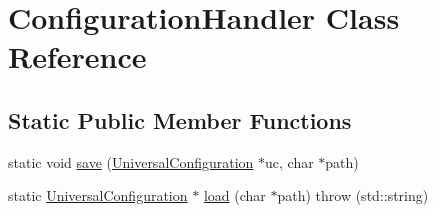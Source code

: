\hypertarget{classConfigurationHandler}{
\section{ConfigurationHandler Class Reference}
\label{classConfigurationHandler}
}
\subsection*{Static Public Member Functions}
\begin{DoxyCompactItemize}
\item 
static void \hyperlink{classConfigurationHandler_aa674575c4f2239d750ad76b47eb239ad}{save} (\hyperlink{classUniversalConfiguration}{UniversalConfiguration} $\ast$uc, char $\ast$path)
\item 
static \hyperlink{classUniversalConfiguration}{UniversalConfiguration} $\ast$ \hyperlink{classConfigurationHandler_ab9f2257f8dcaadfb67350c944119176b}{load} (char $\ast$path)  throw (std::string)
\end{DoxyCompactItemize}



